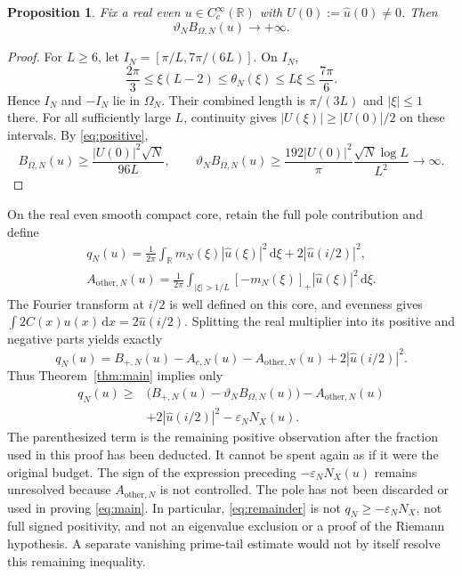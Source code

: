 \documentclass[11pt]{article}
\newtheorem{proposition}[theorem]{Proposition}
\theoremstyle{remark}\newtheorem{remark}[theorem]{Remark}
\newcommand{\R}{\mathbb R}
\newcommand{\dd}{\,\mathrm d}
\newcommand{\NX}{N_X}
\numberwithin{equation}{section}
\begin{document}
\begin{proposition}\label{prop:nonvanishing}
Fix a real even $u\in C_c^\infty(\R)$ with $U(0):=\widehat u(0)\ne0$. Then
\begin{equation}\label{eq:divergence}
 \vartheta_NB_{\Omega,N}(u)\longrightarrow+\infty.
\end{equation}
\end{proposition}
\begin{proof}
For $L\ge6$, let $I_N=[\pi/L,7\pi/(6L)]$. On $I_N$,
\[
 \frac{2\pi}3\le\xi(L-2)\le\theta_N(\xi)\le L\xi\le\frac{7\pi}6.
\]
Hence $I_N$ and $-I_N$ lie in $\Omega_N$. Their combined length is $\pi/(3L)$ and $|\xi|\le1$ there. For all sufficiently large $L$, continuity gives $|U(\xi)|\ge|U(0)|/2$ on these intervals. By \eqref{eq:positive},
\[
 B_{\Omega,N}(u)\ge\frac{|U(0)|^2\sqrt N}{96L},\qquad
 \vartheta_NB_{\Omega,N}(u)
 \ge\frac{192|U(0)|^2}{\pi}\frac{\sqrt N\log L}{L^2}\longrightarrow\infty.
\]
\end{proof}

On the real even smooth compact core, retain the full pole contribution and define
\begin{gather}
 q_N(u)=\frac1{2\pi}\int_\R m_N(\xi)|\widehat u(\xi)|^2\dd\xi
                       +2|\widehat u(i/2)|^2,\label{eq:q}\\
 A_{\mathrm{other},N}(u)=\frac1{2\pi}\int_{|\xi|>1/L}
                 [-m_N(\xi)]_+|\widehat u(\xi)|^2\dd\xi.\label{eq:other}
\end{gather}
The Fourier transform at $i/2$ is well defined on this core, and evenness gives $\int2C(x)u(x)\dd x=2\widehat u(i/2)$. Splitting the real multiplier into its positive and negative parts yields exactly
\begin{equation}\label{eq:qidentity}
 q_N(u)=B_{+,N}(u)-A_{c,N}(u)-A_{\mathrm{other},N}(u)
                         +2|\widehat u(i/2)|^2.
\end{equation}
Thus Theorem~\ref{thm:main} implies only
\begin{equation}\label{eq:remainder}
 \begin{split}
 q_N(u)\ge{}&\bigl(B_{+,N}(u)-\vartheta_NB_{\Omega,N}(u)\bigr)
             -A_{\mathrm{other},N}(u)\\
             &+2|\widehat u(i/2)|^2-\varepsilon_N\NX(u).
 \end{split}
\end{equation}
The parenthesized term is the remaining positive observation after the fraction used in this proof has been deducted. It cannot be spent again as if it were the original budget. The sign of the expression preceding $-\varepsilon_N\NX(u)$ remains unresolved because $A_{\mathrm{other},N}$ is not controlled. The pole has not been discarded or used in proving \eqref{eq:main}. In particular, \eqref{eq:remainder} is not $q_N\ge-\varepsilon_N\NX$, not full signed positivity, and not an eigenvalue exclusion or a proof of the Riemann hypothesis. A separate vanishing prime-tail estimate would not by itself resolve this remaining inequality.
\end{document}
